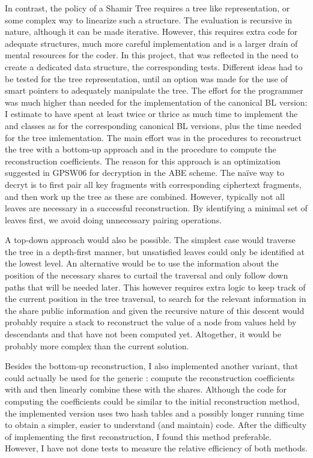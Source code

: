 \documentclass{article}
\begin{document}
In contrast, the policy of a Shamir Tree requires a tree like representation, or some complex way to linearize such a structure. The evaluation is recursive in nature, although it can be made iterative. However, this requires extra code for adequate structures, much more careful implementation and is a larger drain of mental resources for the coder. In this project, that was reflected in the need to create a dedicated data structure, the corresponding tests. Different ideas had to be tested for the tree representation, until an option was made for the use of smart pointers to adequately manipulate the tree. The effort for the programmer was much higher than needed for the implementation of the canonical BL version: I estimate to have spent at least twice or thrice as much time to implement the \cShTree and \cShTreeAP classes as for the corresponding canonical BL versions, plus the time needed for the tree imlementation. The main effort was in the procedures to reconstruct the tree with a bottom-up approach and in the procedure to compute the reconstruction coefficients.
The reason for this approach is an optimization suggested in GPSW06 for decryption in the ABE scheme. The na\"ive way to decryt is to first pair all key fragments with corresponding ciphertext fragments, and then work up the tree as these are combined. However, typically not all leaves are necessary in a successful reconstruction. By identifying a minimal set of leaves first, we avoid doing unnecessary pairing operations. 

A top-down approach would also be possible. The simplest case would traverse the tree in a depth-first manner, but unsatisfied leaves could only be identified at the lowest level. An alternative would be to use the information about the position of the necessary shares to curtail the traversal and only follow down paths that will be needed later. This however requires extra logic to keep track of the current position in the tree traversal, to search for the relevant information in the share public information and given the recursive nature of this descent would probably require a stack to reconstruct the value of a node from values held by descendants and that have not been computed yet. Altogether, it would be probably more complex than the current solution.

Besides the bottom-up reconstruction, I also implemented another variant, that could actually be used for the generic \cSS: compute the reconstruction coefficients with  and then linearly combine these with the shares. Although the code for computing the coefficients could be similar to the initial reconstruction method, the implemented version uses two hash tables and a possibly longer running time to obtain a simpler, easier to understand (and maintain) code. After the difficulty of implementing the first reconstruction, I found this method preferable. However, I have not done tests to measure the relative efficiency of both methods. 
\end{document}
